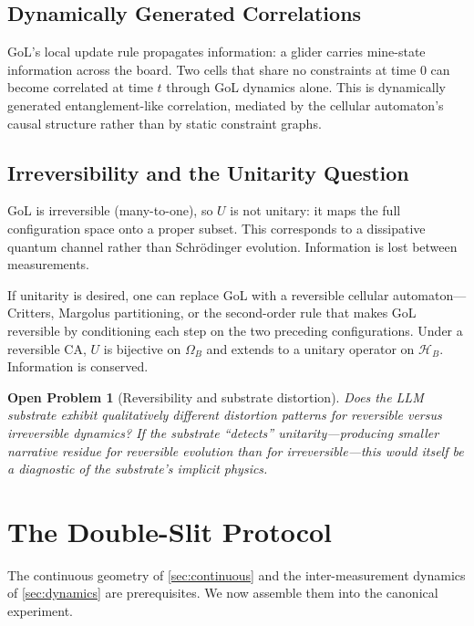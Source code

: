 \documentclass[12pt,a4paper]{article}
\newtheorem{openproblem}[theorem]{Open Problem}
\theoremstyle{definition}
\theoremstyle{remark}
\newcommand{\Hil}{\mathcal{H}}
\newcommand{\Conf}{\Omega}
\begin{document}
\subsection{Dynamically Generated Correlations}

GoL's local update rule propagates information: a glider carries mine-state information across the board.  Two cells that share no constraints at time $0$ can become correlated at time $t$ through GoL dynamics alone.  This is dynamically generated entanglement-like correlation, mediated by the cellular automaton's causal structure rather than by static constraint graphs.

\subsection{Irreversibility and the Unitarity Question}
\label{sec:reversibility}

GoL is irreversible (many-to-one), so $U$ is not unitary: it maps the full configuration space onto a proper subset.  This corresponds to a dissipative quantum channel rather than Schrödinger evolution.  Information is lost between measurements.

If unitarity is desired, one can replace GoL with a reversible cellular automaton---Critters, Margolus partitioning, or the second-order rule that makes GoL reversible by conditioning each step on the two preceding configurations.  Under a reversible CA, $U$ is bijective on $\Conf_B$ and extends to a unitary operator on $\Hil_B$.  Information is conserved.

\begin{openproblem}[Reversibility and substrate distortion]
\label{op:reversibility}
Does the LLM substrate exhibit qualitatively different distortion patterns for reversible versus irreversible dynamics?  If the substrate ``detects'' unitarity---producing smaller narrative residue for reversible evolution than for irreversible---this would itself be a diagnostic of the substrate's implicit physics.
\end{openproblem}


\section{The Double-Slit Protocol}
\label{sec:double-slit}

The continuous geometry of \cref{sec:continuous} and the inter-measurement dynamics of \cref{sec:dynamics} are prerequisites.  We now assemble them into the canonical experiment.
\end{document}
